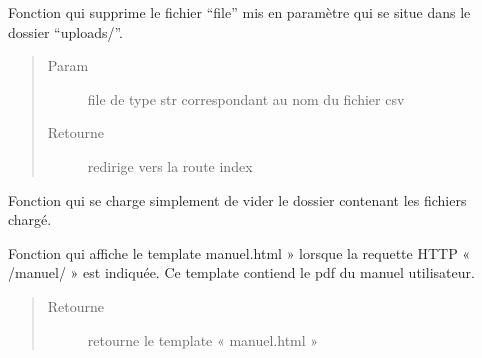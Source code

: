 \documentclass[letterpaper,10pt,openany,oneside,french]{sphinxmanual}
\begin{document}
\begin{fulllineitems}
\label{\detokenize{gestionFlux:interface_web.gestionFlux.remove}}
Fonction qui supprime le fichier “file” mis en paramètre qui se situe dans le dossier “uploads/”.
\begin{quote}\begin{description}
\item[{Param}] \leavevmode
file de type str correspondant au nom du fichier csv

\item[{Retourne}] \leavevmode
redirige vers la route index

\end{description}\end{quote}

\end{fulllineitems}


\begin{fulllineitems}
\label{\detokenize{gestionFlux:interface_web.gestionFlux.removeFiles}}
Fonction qui se charge simplement de vider le dossier contenant les fichiers chargé.

\end{fulllineitems}


\begin{fulllineitems}
\label{\detokenize{gestionFlux:interface_web.gestionFlux.manuel}}
Fonction qui affiche le template manuel.html » lorsque la requette HTTP « /manuel/ » est indiquée. 
Ce template contiend le pdf du manuel utilisateur.
\begin{quote}\begin{description}
\item[{Retourne}] \leavevmode
retourne le template « manuel.html »

\end{description}\end{quote}

\end{fulllineitems}

\end{document}
